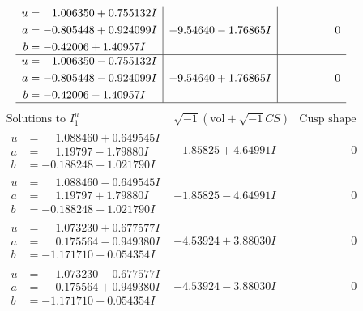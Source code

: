 \documentclass[1p]{elsarticle_modified}
\theoremstyle{definition}
\newcommand{\I}{\sqrt{-1}}
\begin{document}
$$\begin{array}{c|c|c}
\begin{aligned}
u &= \phantom{-}1.006350 + 0.755132 I \\
a &= -0.805448 + 0.924099 I \\
b &= -0.42006 + 1.40957 I\end{aligned}
 & -9.54640 - 1.76865 I & \phantom{-0.000000 } 0 \\ \hline\begin{aligned}
u &= \phantom{-}1.006350 - 0.755132 I \\
a &= -0.805448 - 0.924099 I \\
b &= -0.42006 - 1.40957 I\end{aligned}
 & -9.54640 + 1.76865 I & \phantom{-0.000000 } 0\\
 \hline 
 \end{array}$$\newpage$$\begin{array}{c|c|c}  
\text{Solutions to }I^u_{1}& \I (\text{vol} + \sqrt{-1}CS) & \text{Cusp shape}\\
 \hline 
\begin{aligned}
u &= \phantom{-}1.088460 + 0.649545 I \\
a &= \phantom{-}1.19797 - 1.79880 I \\
b &= -0.188248 - 1.021790 I\end{aligned}
 & -1.85825 + 4.64991 I & \phantom{-0.000000 } 0 \\ \hline\begin{aligned}
u &= \phantom{-}1.088460 - 0.649545 I \\
a &= \phantom{-}1.19797 + 1.79880 I \\
b &= -0.188248 + 1.021790 I\end{aligned}
 & -1.85825 - 4.64991 I & \phantom{-0.000000 } 0 \\ \hline\begin{aligned}
u &= \phantom{-}1.073230 + 0.677577 I \\
a &= \phantom{-}0.175564 - 0.949380 I \\
b &= -1.171710 + 0.054354 I\end{aligned}
 & -4.53924 + 3.88030 I & \phantom{-0.000000 } 0 \\ \hline\begin{aligned}
u &= \phantom{-}1.073230 - 0.677577 I \\
a &= \phantom{-}0.175564 + 0.949380 I \\
b &= -1.171710 - 0.054354 I\end{aligned}
 & -4.53924 - 3.88030 I & \phantom{-0.000000 } 0 \\ \hline\begin{aligned}

\end{aligned}
\end{array}$$
\end{document}
